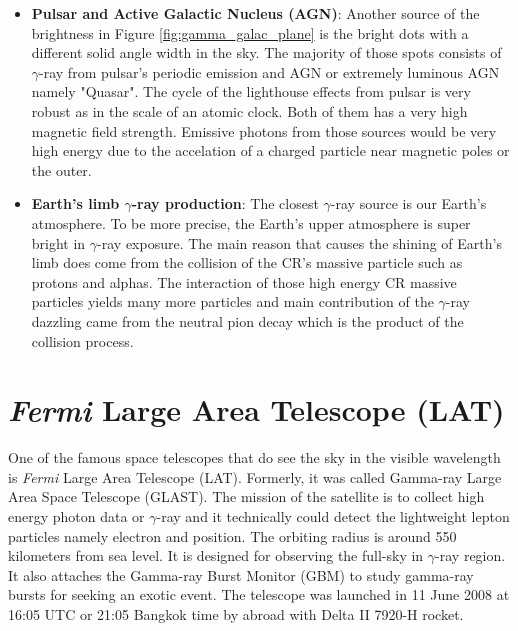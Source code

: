 \begin{itemize}
    \item \textbf{Pulsar and Active Galactic Nucleus (AGN)}: 
    Another source of the brightness in Figure \ref{fig:gamma_galac_plane}
    is the bright dots with a different solid angle width in the sky.
    The majority of those spots consists of $\gamma$-ray from 
    pulsar's periodic emission and AGN or extremely luminous AGN
    namely "Quasar". The cycle of the lighthouse effects from pulsar 
    is very robust as in the scale of an atomic clock. Both of them 
    has a very high magnetic field strength. Emissive photons from 
    those sources would be very high energy due to the accelation 
    of a charged particle near magnetic poles or the outer.


    \item \textbf{Earth's limb $\gamma$-ray production}:
    The closest $\gamma$-ray source is our Earth's atmosphere.
    To be more precise, the Earth's upper atmosphere is super bright 
    in $\gamma$-ray exposure. The main reason that causes the shining 
    of Earth's limb does come from the collision of the CR's massive
    particle such as protons and alphas. The interaction of those high 
    energy CR massive particles yields many more particles and main 
    contribution of the $\gamma$-ray dazzling came from the neutral pion
    decay which is the product of the collision process.

\end{itemize}



\section{\textit{Fermi} Large Area Telescope (LAT)}
One of the famous space telescopes that do see the sky in the 
visible wavelength is \textit{Fermi} Large Area Telescope (LAT).
Formerly, it was called Gamma-ray Large Area Space Telescope (GLAST).
The mission of the satellite is to collect high energy photon data 
or $\gamma$-ray and it technically could detect the lightweight
lepton particles namely electron and position.
The orbiting radius is around 550 kilometers
from sea level. It is designed for observing the full-sky in 
$\gamma$-ray region. It also attaches the Gamma-ray Burst Monitor (GBM) to study gamma-ray
bursts for seeking an exotic event. The telescope was launched in 
11 June 2008 at 16:05 UTC or 21:05 Bangkok time by abroad with 
Delta II 7920-H rocket.


